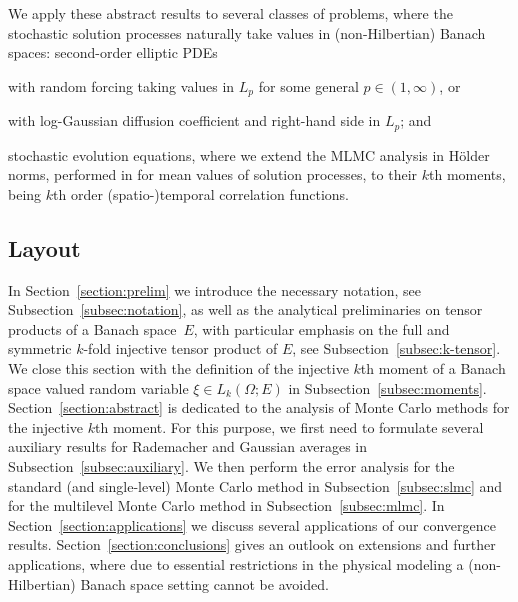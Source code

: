 \documentclass[reqno]{amsart}
\numberwithin{equation}{section}
\theoremstyle{remark}
\theoremstyle{definition}
\begin{document}
We apply these abstract results 
to several classes of problems, 
where the stochastic solution 
processes naturally take values in 
(non-Hilbertian) Banach spaces: 
second-order elliptic PDEs  
\begin{enumerate*}[label=(\alph*)]
	\item with random forcing  
	taking values in $L_p$ 
	for some general $p\in(1,\infty)$, or 
	\item with log-Gaussian diffusion coefficient 
	and right-hand side in $L_p$; and 
	\item stochastic evolution equations, 
	where we extend the MLMC analysis in H\"older 
	norms, performed in \cite[Section~5]{CoxEtAl2021} 
	for mean values of solution processes,  
	to their $k$th moments, 
	being $k$th order (spatio-)temporal
	correlation functions. 
\end{enumerate*}

\subsection{Layout}
\label{subsec:outline} 

In Section~\ref{section:prelim} 
we introduce the necessary notation, 
see Subsection~\ref{subsec:notation}, 
as well as the analytical preliminaries on  
tensor products of a Banach space~$E$, 
with particular emphasis on the full and symmetric 
$k$-fold injective tensor product of $E$, 
see Subsection~\ref{subsec:k-tensor}.  
We close this section with the definition 
of the injective $k$th moment of a Banach space 
valued random variable $\xi\in L_k(\Omega;E)$ 
in Subsection~\ref{subsec:moments}. 
Section~\ref{section:abstract} is dedicated 
to the analysis of Monte Carlo 
methods for the injective $k$th moment. 
For this purpose, 
we first need to formulate several auxiliary 
results for Rademacher and Gaussian averages 
in Subsection~\ref{subsec:auxiliary}. 
We then perform the error analysis for the 
standard (and single-level) Monte Carlo method 
in Subsection~\ref{subsec:slmc} 
and for the multilevel Monte Carlo method 
in Subsection~\ref{subsec:mlmc}. 
In Section~\ref{section:applications} 
we discuss several applications of our 
convergence results. 
%
Section~\ref{section:conclusions} 
gives an outlook on extensions 
and further applications, where 
due to essential restrictions in the physical modeling 
a (non-Hilbertian) Banach space setting cannot 
be avoided.
\end{document}
